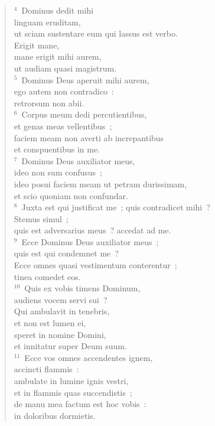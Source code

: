 \begin{verse}${}^{4}$~Dominus dedit mihi\\ linguam eruditam,\\ ut sciam sustentare eum qui lassus est verbo.\\ Erigit mane,\\ mane erigit mihi aurem,\\ ut audiam quasi magistrum.\\
${}^{5}$~Dominus Deus aperuit mihi aurem,\\ ego autem non contradico~:\\ retrorsum non abii.\\
${}^{6}$~Corpus meum dedi percutientibus,\\ et genas meas vellentibus~;\\ faciem meam non averti ab increpantibus\\ et conspuentibus in me.\\
${}^{7}$~Dominus Deus auxiliator meus,\\ ideo non sum confusus~;\\ ideo posui faciem meam ut petram durissimam,\\ et scio quoniam non confundar.\\
${}^{8}$~Juxta est qui justificat me~; quis contradicet mihi~?\\ Stemus simul~;\\ quis est adversarius meus~? accedat ad me.\\
${}^{9}$~Ecce Dominus Deus auxiliator meus~;\\ quis est qui condemnet me~?\\ Ecce omnes quasi vestimentum conterentur~;\\ tinea comedet eos.\\
${}^{10}$~Quis ex vobis timens Dominum,\\ audiens vocem servi sui~?\\ Qui ambulavit in tenebris,\\ et non est lumen ei,\\ speret in nomine Domini,\\ et innitatur super Deum suum.\\
${}^{11}$~Ecce vos omnes accendentes ignem,\\ accincti flammis~:\\ ambulate in lumine ignis vestri,\\ et in flammis quas succendistis~;\\ de manu mea factum est hoc vobis~:\\ in doloribus dormietis.\end{verse}


